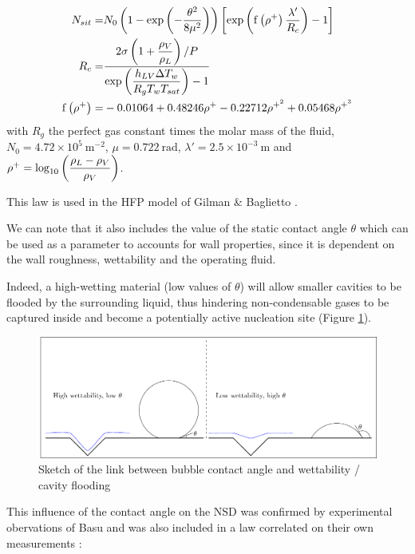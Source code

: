 \begin{align}
N_{sit} =& N_{0}\parth{1-\exp{-\dfrac{\theta^{2}}{8\mu^{2}} } }\crocht{\exp{ \mathrm{f}\parth{\rho^{+}}\dfrac{\lambda '}{R_{c}} } -1}
\label{eq:nsit_hibiki} \\
%
R_{c} =& \dfrac{2\sigma\parth{1+\dfrac{\rho_{V}}{\rho_{L}}} / P }{\exp{\dfrac{h_{LV} \Delta T_{w}}{R_{g}T_{w}T_{sat}} } -1}\\
%
\mathrm{f}\parth{\rho^{+}} =& -0.01064 + 0.48246\rho^{+} - 0.22712 \rho^{+^{2}} + 0.05468 \rho^{+^{3}}
\end{align}
with $R_{g}$ the perfect gas constant times the molar mass of the fluid,  $N_{0}=4.72\times 10^{5}\ \mathrm{m}^{-2}$, $\mu = 0.722\ \mathrm{rad}$, $\lambda ' = 2.5 \times 10^{-3} \ \mathrm{m}$ and $\rho^{+}=\mathrm{log}_{10}\left( \dfrac{\rho_{L}-\rho_{V}}{\rho_{V}} \right)$.


\begin{remark*}{}
This law is used in the HFP model of Gilman \& Baglietto \cite{gilman_baglietto}.
\end{remark*}

We can note that it also includes the value of the static contact angle $\theta$ which can be used as a parameter to accounts for wall properties, since it is dependent on the wall roughness, wettability and the operating fluid. 

Indeed, a high-wetting material (low values of $\theta$) will allow smaller cavities to be flooded by the surrounding liquid, thus hindering non-condensable gases to be captured inside and become a potentially active nucleation site (Figure \ref{fig:nsd_theta_wet}).

\begin{figure}[h!]
\centering
\includegraphics[scale=0.8]{img/NSD/wettability.pdf}
\caption{Sketch of the link between bubble contact angle and wettability / cavity flooding}
\label{fig:nsd_theta_wet}
\end{figure}

This influence of the contact angle on the NSD was confirmed by experimental obervations of Basu \etal \cite{basu_nsit} and was also included in a law correlated on their own measurements :

